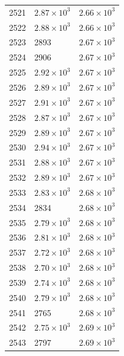 \begin{table}[H]
\begin{tabular}{lll}
2521 & $\displaystyle 2.87 \times 10^{3}$ & $\displaystyle 2.66 \times 10^{3}$ \\
2522 & $\displaystyle 2.88 \times 10^{3}$ & $\displaystyle 2.66 \times 10^{3}$ \\
2523 & 2893 & $\displaystyle 2.67 \times 10^{3}$ \\
2524 & 2906 & $\displaystyle 2.67 \times 10^{3}$ \\
2525 & $\displaystyle 2.92 \times 10^{3}$ & $\displaystyle 2.67 \times 10^{3}$ \\
2526 & $\displaystyle 2.89 \times 10^{3}$ & $\displaystyle 2.67 \times 10^{3}$ \\
2527 & $\displaystyle 2.91 \times 10^{3}$ & $\displaystyle 2.67 \times 10^{3}$ \\
2528 & $\displaystyle 2.87 \times 10^{3}$ & $\displaystyle 2.67 \times 10^{3}$ \\
2529 & $\displaystyle 2.89 \times 10^{3}$ & $\displaystyle 2.67 \times 10^{3}$ \\
2530 & $\displaystyle 2.94 \times 10^{3}$ & $\displaystyle 2.67 \times 10^{3}$ \\
2531 & $\displaystyle 2.88 \times 10^{3}$ & $\displaystyle 2.67 \times 10^{3}$ \\
2532 & $\displaystyle 2.89 \times 10^{3}$ & $\displaystyle 2.67 \times 10^{3}$ \\
2533 & $\displaystyle 2.83 \times 10^{3}$ & $\displaystyle 2.68 \times 10^{3}$ \\
2534 & 2834 & $\displaystyle 2.68 \times 10^{3}$ \\
2535 & $\displaystyle 2.79 \times 10^{3}$ & $\displaystyle 2.68 \times 10^{3}$ \\
2536 & $\displaystyle 2.81 \times 10^{3}$ & $\displaystyle 2.68 \times 10^{3}$ \\
2537 & $\displaystyle 2.72 \times 10^{3}$ & $\displaystyle 2.68 \times 10^{3}$ \\
2538 & $\displaystyle 2.70 \times 10^{3}$ & $\displaystyle 2.68 \times 10^{3}$ \\
2539 & $\displaystyle 2.74 \times 10^{3}$ & $\displaystyle 2.68 \times 10^{3}$ \\
2540 & $\displaystyle 2.79 \times 10^{3}$ & $\displaystyle 2.68 \times 10^{3}$ \\
2541 & 2765 & $\displaystyle 2.68 \times 10^{3}$ \\
2542 & $\displaystyle 2.75 \times 10^{3}$ & $\displaystyle 2.69 \times 10^{3}$ \\
2543 & 2797 & $\displaystyle 2.69 \times 10^{3}$ \\

\end{tabular}
\end{table}
